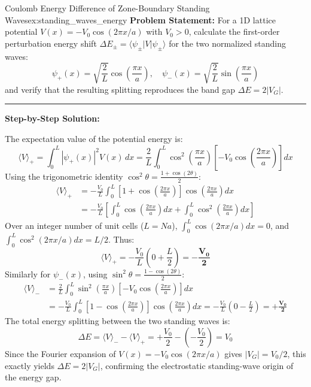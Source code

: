 \documentclass[11pt,a4paper]{article}
\begin{document}
\vspace{0.4cm}

\begin{examplebox}{Coulomb Energy Difference of Zone-Boundary Standing Waves}{ex:standing_waves_energy}
\textbf{Problem Statement:}
For a 1D lattice potential $V(x) = -V_0 \cos(2\pi x/a)$ with $V_0 > 0$, calculate the first-order perturbation energy shift $\Delta E_\pm = \langle \psi_\pm | V | \psi_\pm \rangle$ for the two normalized standing waves:
\[
\psi_+(x) = \sqrt{\frac{2}{L}}\cos\left(\frac{\pi x}{a}\right), \quad \psi_-(x) = \sqrt{\frac{2}{L}}\sin\left(\frac{\pi x}{a}\right)
\]
and verify that the resulting splitting reproduces the band gap $\Delta E = 2|V_G|$.

\vspace{0.2cm}\hrule\vspace{0.2cm}
\textbf{Step-by-Step Solution:}

The expectation value of the potential energy is:
\[
\langle V \rangle_+ = \int_0^L |\psi_+(x)|^2 V(x)\,dx = \frac{2}{L}\int_0^L \cos^2\left(\frac{\pi x}{a}\right)\left[-V_0 \cos\left(\frac{2\pi x}{a}\right)\right]dx
\]
Using the trigonometric identity $\cos^2\theta = \frac{1 + \cos(2\theta)}{2}$:
\begin{align*}
\langle V \rangle_+ &= -\frac{V_0}{L}\int_0^L \left[1 + \cos\left(\frac{2\pi x}{a}\right)\right]\cos\left(\frac{2\pi x}{a}\right)dx \\
&= -\frac{V_0}{L}\left[ \int_0^L \cos\left(\frac{2\pi x}{a}\right)dx + \int_0^L \cos^2\left(\frac{2\pi x}{a}\right)dx \right]
\end{align*}
Over an integer number of unit cells ($L = N a$), $\int_0^L \cos(2\pi x/a)dx = 0$, and $\int_0^L \cos^2(2\pi x/a)dx = L/2$.
Thus:
\[
\langle V \rangle_+ = -\frac{V_0}{L}\left( 0 + \frac{L}{2} \right) = \mathbf{-\frac{V_0}{2}}
\]
Similarly for $\psi_-(x)$, using $\sin^2\theta = \frac{1 - \cos(2\theta)}{2}$:
\begin{align*}
\langle V \rangle_- &= \frac{2}{L}\int_0^L \sin^2\left(\frac{\pi x}{a}\right)\left[-V_0 \cos\left(\frac{2\pi x}{a}\right)\right]dx \\
&= -\frac{V_0}{L}\int_0^L \left[1 - \cos\left(\frac{2\pi x}{a}\right)\right]\cos\left(\frac{2\pi x}{a}\right)dx = -\frac{V_0}{L}\left( 0 - \frac{L}{2} \right) = \mathbf{+\frac{V_0}{2}}
\end{align*}
The total energy splitting between the two standing waves is:
\[
\Delta E = \langle V \rangle_- - \langle V \rangle_+ = +\frac{V_0}{2} - \left(-\frac{V_0}{2}\right) = V_0
\]
Since the Fourier expansion of $V(x) = -V_0\cos(2\pi x/a)$ gives $|V_G| = V_0/2$, this exactly yields $\Delta E = 2|V_G|$, confirming the electrostatic standing-wave origin of the energy gap.
\end{examplebox}
\end{document}
